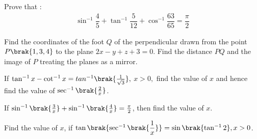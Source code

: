 
\item Prove that :
    \begin{align*}
       \sin^{-1}\dfrac{4}{5}+\tan^{-1}\dfrac{5}{12}+\cos^{-1}\dfrac{63}{65}=\dfrac{\pi}{2}
    \end{align*}

\item Find the coordinates of the foot $Q$ of the perpendicular drawn from the point $P\brak{1,3,4}$ to the plane $2x-y+z+3=0$. Find the distance $PQ$ and the image of $P$ treating the planes as a mirror.


\item If $\tan^{-1}{x} - \cot^{-1} {x}= tan^{-1}\brak{\frac{1}{\sqrt{3}}},$ $x > 0,$ find the value of $x$ and hence find the value of $\sec^{-1}\brak{\frac{2}{x}}$.
 \item If $\sin^{-1}\brak{\frac{3}{x}} + \sin^{-1}\brak{\frac{4}{x}} = \frac{\pi}{2}$, then find the value of $x$.
 \item Find  the value of $x$, if $\tan\brak{\sec^{-1}\brak{\dfrac{1}{x}}}  = \sin \brak{\tan^{-1}{2}},x>0$.


